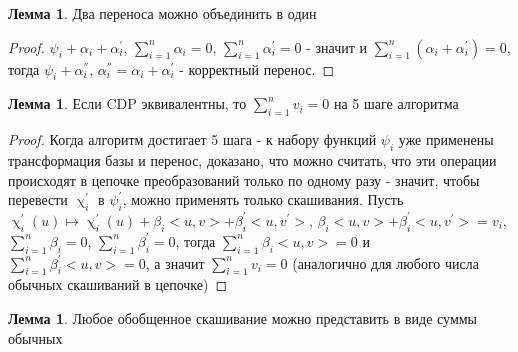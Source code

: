 \documentclass[16pt]{article}
\theoremstyle{definition}
\newtheorem{lemma}[theorem]{Лемма}
\begin{document}
\begin{lemma}
	Два переноса можно объединить в один
\end{lemma}

\begin{proof}
$\psi_i + \alpha_i + \alpha^{'}_i$, $\sum_{i=1}^n\alpha_i = 0$, $\sum_{i=1}^n\alpha^{'}_i = 0$ - значит и $\sum_{i=1}^n(\alpha_i + \alpha^{'}_i) = 0$, тогда $\psi_i + \alpha^{''}_i$, $\alpha^{''}_i = \alpha_i + \alpha^{'}_i$ - корректный перенос.	
\end{proof}

\begin{lemma}
	Если CDP эквивалентны, то $\sum_{i=1}^n v_i = 0$ на 5 шаге алгоритма
\end{lemma}
\begin{proof}
	Когда алгоритм достигает 5 шага - к набору функций $\psi_i$ уже применены трансформация базы и перенос, доказано, что можно считать, что эти операции происходят в цепочке преобразований только по одному разу - значит, чтобы перевести $\upchi^{'}_i$ в $\psi^{'}_i$, можно применять только скашивания. 
Пусть $\upchi^{'}_i(u) \mapsto \upchi^{'}_i(u) + \beta_i<u, v> + \beta_i^{'}<u, v^{'}>$, 
$\beta_i<u, v> + \beta_i^{'}<u, v^{'}> = v_i$, 
$\sum_{i=1}^{n} \beta_i = 0$, 
$\sum_{i=1}^{n} \beta^{'}_i = 0$, 
тогда $\sum_{i=1}^{n} \beta_i<u, v>= 0$ и $\sum_{i=1}^{n} \beta^{'}_i<u, v>= 0$, 
а значит $\sum_{i=1}^{n} v_i = 0$ (аналогично для любого числа обычных скашиваний в цепочке)
\end{proof}

\begin{lemma}
	Любое обобщенное скашивание можно представить в виде суммы обычных
\end{lemma}
\end{document}
